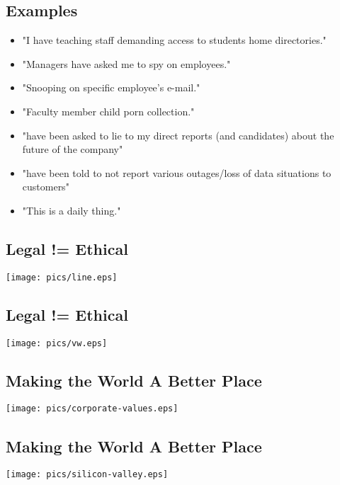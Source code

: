 \documentclass[xga]{xdvislides}
\begin{document}
\subsection{Examples}
\begin{itemize}
	\item "I have teaching staff demanding access to students home directories."
	\item "Managers have asked me to spy on employees."
	\item "Snooping on specific employee's e-mail."
	\item "Faculty member child porn collection."
	\item "have been asked to lie to my direct reports (and candidates) about the future of the company"
	\item "have been told to not report various outages/loss of data situations to customers"
	\item "This is a daily thing."
\end{itemize}

\subsection{Legal != Ethical}
\vspace*{\fill}
\begin{center}
	\texttt{[image: pics/line.eps]}
\end{center}
\vspace*{\fill}

\subsection{Legal != Ethical}
\vspace*{\fill}
\begin{center}
	\texttt{[image: pics/vw.eps]}
\end{center}
\vspace*{\fill}

\subsection{Making the World A Better Place}
\vspace*{\fill}
\begin{center}
	\texttt{[image: pics/corporate-values.eps]}
\end{center}
\vspace*{\fill}

\subsection{Making the World A Better Place}
\vspace*{\fill}
\begin{center}
	\texttt{[image: pics/silicon-valley.eps]}
\end{center}
\vspace*{\fill}
\end{document}
